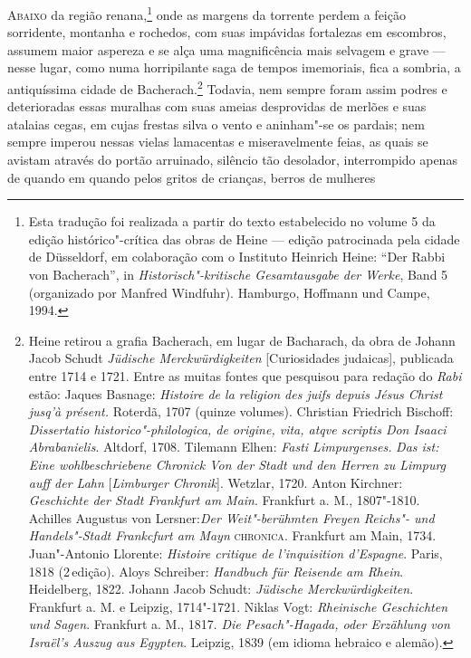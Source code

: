 \textsc{Abaixo} da região renana,\footnote{ Esta tradução foi
realizada a partir do texto estabelecido no volume 5 da edição
histórico"-crítica das obras de Heine --- edição patrocinada pela cidade de
Düsseldorf, em colaboração com o Instituto Heinrich Heine: ``Der Rabbi von
Bacherach'', in \textit{Historisch"-kritische Gesamtausgabe der Werke}, Band 5
(organizado por Manfred Windfuhr).  Hamburgo, Hoffmann und Campe, 1994.}
onde as margens da torrente perdem a feição
sorridente, montanha e rochedos, com suas impávidas fortalezas em
escombros, assumem maior aspereza e se alça uma magnificência mais
selvagem e grave --- nesse lugar, como numa horripilante saga de tempos
imemoriais, fica a sombria, a antiquíssima cidade de
Bacherach.\footnote{ Heine
retirou a grafia Bacherach, em lugar de Bacharach, da obra de Johann
Jacob Schudt \textit{Jüdische Merckwürdigkeiten }[Curiosidades
judaicas], publicada entre 1714 e 1721. Entre as muitas fontes que
pesquisou para redação do \textit{Rabi }estão: Jaques Basnage:
\textit{Histoire de la religion des juifs depuis Jésus Christ
jusq'à présent.} Roterdã, 1707 (quinze volumes).
Christian Friedrich Bischoff: \textit{Dissertatio
historico"-philologica, de origine, vita, atqve scriptis Don Isaaci
Abrabanielis}. Altdorf, 1708.  Tilemann Elhen: \textit{Fasti
Limpurgenses. }\textit{Das ist: Eine wohlbeschriebene Chronick Von der
Stadt und den Herren zu Limpurg auff der Lahn} [\textit{Limburger
Chronik}]. Wetzlar, 1720.   Anton Kirchner: \textit{{\A Geschichte der
Stadt Frankfurt am Main}}. Frankfurt a. M., 1807"-1810. Achilles
Augustus von Lersner:\textit{{\A Der Weit"-berühmten Freyen Reichs"- und
Handels"-Stadt Frankcfurt am Mayn}} \textsc{chronica}. Frankfurt am Main, 1734.
 Juan"-Antonio Llorente: \textit{Histoire critique de
l’inquisition d’Espagne}. Paris, 1818 (2\ai\,edição). Aloys Schreiber:
\textit{{\A Handbuch für Reisende am Rhein}}. Heidelberg, 1822.
Johann Jacob Schudt: \textit{{\A Jüdische Merckwürdigkeiten}}. Frankfurt a.
M. e Leipzig, 1714"-1721. Niklas Vogt: \textit{{\A Rheinische
Geschichten und Sagen}}. Frankfurt a. M., 1817.  \textit{Die
Pesach"-Hagada, oder Erzählung von Israël’s Auszug aus Egypten}.
Leipzig, 1839 (em idioma hebraico e alemão).}
 Todavia, nem sempre foram assim podres e deterioradas essas muralhas
com suas ameias desprovidas de merlões e suas atalaias cegas, em cujas
frestas silva o vento e aninham"-se os pardais; nem sempre imperou
nessas vielas lamacentas e miseravelmente feias, as quais se avistam
através do portão arruinado, silêncio tão desolador, interrompido
apenas de quando em quando pelos gritos de crianças, berros de mulheres
